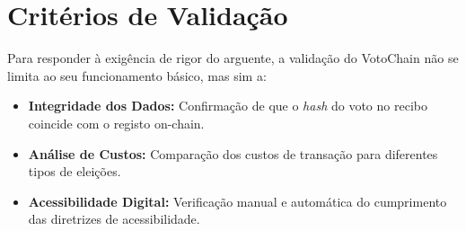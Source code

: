 \section{Critérios de Validação}
Para responder à exigência de rigor do arguente, a validação do VotoChain não se limita ao seu funcionamento básico, mas sim a:
\begin{itemize}
    \item \textbf{Integridade dos Dados:} Confirmação de que o \textit{hash} do voto no recibo coincide com o registo on-chain.
    \item \textbf{Análise de Custos:} Comparação dos custos de transação para diferentes tipos de eleições.
    \item \textbf{Acessibilidade Digital:} Verificação manual e automática do cumprimento das diretrizes de acessibilidade.
\end{itemize}
